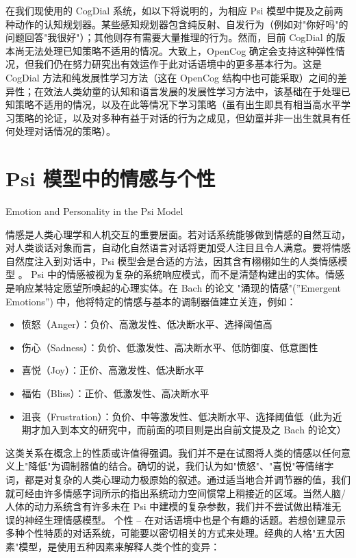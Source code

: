 在我们现使用的 CogDial 系统，如以下将说明的，为相应 Psi 模型中提及之前两种动作的认知规划器。某些感知规划器包含纯反射、自发行为（例如对"你好吗"的问题回答"我很好"）；其他则存有需要大量推理的行为。然而，目前 CogDial 的版本尚无法处理已知策略不适用的情况。大致上，OpenCog 确定会支持这种弹性情况，但我们仍在努力研究出有效运作于此对话语境中的更多基本行为。这是 CogDial 方法和纯发展性学习方法（这在 OpenCog 结构中也可能采取）之间的差异性；在效法人类幼童的认知和语言发展的发展性学习方法中，该基础在于处理已知策略不适用的情况，以及在此等情况下学习策略（虽有出生即具有相当高水平学习策略的论证，以及对多种有益于对话的行为之成见，但幼童并非一出生就具有任何处理对话情况的策略）。

\section{Psi 模型中的情感与个性}{Emotion and Personality in the Psi Model}

情感是人类心理学和人机交互的重要层面。若对话系统能够做到情感的自然互动，对人类谈话对象而言，自动化自然语言对话将更加受人注目且令人满意。要将情感自然度注入到对话中，Psi 模型会是合适的方法，因其含有栩栩如生的人类情感模型 。
Psi 中的情感被视为复杂的系统响应模式，而不是清楚构建出的实体。情感是响应某特定愿望所唤起的心理实体。在 Bach 的论文 \cite{Bach2012} "涌现的情感"(”Emergent Emotions”) 中，他将特定的情感与基本的调制器值建立关连，例如：

\begin{itemize}
\item 愤怒（Anger）：负价、高激发性、低决断水平、选择阈值高
\item 伤心（Sadness）：负价、低激发性、高决断水平、低防御度、低意图性 
\item 喜悦（Joy）：正价、高激发性、低决断水平
\item 福佑（Bliss）：正价、低激发性、高决断水平
\item 沮丧（Frustration）：负价、中等激发性、低决断水平、选择阈值低（此为近期才加入到本文的研究中，而前面的项目则是出自前文提及之 Bach 的论文）
\end{itemize}

这类关系在概念上的性质或许值得强调。我们并不是在试图将人类的情感以任何意义上"降低"为调制器值的结合。确切的说，我们认为如"愤怒"、"喜悦"等情绪字词，都是对复杂的人类心理动力极原始的叙述。通过适当地合并调节器的值，我们就可经由许多情感字词所示的指出系统动力空间惯常上稍接近的区域。当然人脑/人体的动力系统含有许多未在 Psi 中建模的复杂参数，我们并不尝试做出精准无误的神经生理情感模型。
个性 – 在对话语境中也是个有趣的话题。若想创建显示多种个性特质的对话系统，可能要以密切相关的方式来处理。经典的人格"五大因素"模型，是使用五种因素来解释人类个性的变异：

